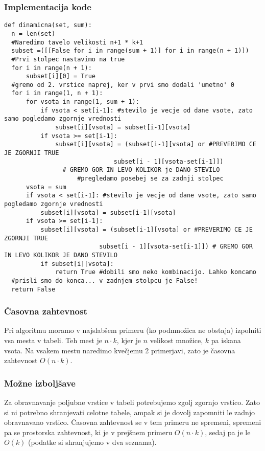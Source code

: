 \documentclass[12pt]{article}
\begin{document}
\subsubsection{Implementacija kode}
\begin{lstlisting}
def dinamicna(set, sum):
  n = len(set)
  #Naredimo tavelo velikosti n+1 * k+1
  subset =([[False for i in range(sum + 1)] for i in range(n + 1)])
  #Prvi stolpec nastavimo na true
  for i in range(n + 1):
      subset[i][0] = True
  #gremo od 2. vrstice naprej, ker v prvi smo dodali 'umetno' 0
  for i in range(1, n + 1):
      for vsota in range(1, sum + 1):
          if vsota < set[i-1]: #stevilo je vecje od dane vsote, zato samo pogledamo zgornje vrednosti 
              subset[i][vsota] = subset[i-1][vsota] 
          if vsota >= set[i-1]:
              subset[i][vsota] = (subset[i-1][vsota] or #PREVERIMO CE JE ZGORNJI TRUE
                              subset[i - 1][vsota-set[i-1]]) 
                # GREMO GOR IN LEVO KOLIKOR je DANO STEVILO
                    #pregledamo posebej se za zadnji stolpec
      vsota = sum
      if vsota < set[i-1]: #stevilo je vecje od dane vsote, zato samo pogledamo zgornje vrednosti 
          subset[i][vsota] = subset[i-1][vsota] 
      if vsota >= set[i-1]:
          subset[i][vsota] = (subset[i-1][vsota] or #PREVERIMO CE JE ZGORNJI TRUE
                          subset[i - 1][vsota-set[i-1]]) # GREMO GOR IN LEVO KOLIKOR JE DANO STEVILO
          if subset[i][vsota]:
              return True #dobili smo neko kombinacijo. Lahko koncamo
  #prisli smo do konca... v zadnjem stolpcu je False!
  return False
\end{lstlisting}

\subsubsection{Časovna zahtevnost}
Pri algoritmu moramo v najslabšem primeru (ko podmnožica ne obstaja) izpolniti vsa mesta
v tabeli. Teh mest je $n \cdot k$, kjer je $n$ velikost množice, $k$ pa iskana vsota. Na vsakem mestu naredimo 
kvečjemu 2 primerjavi, zato je časovna zahtevnost $O(n \cdot k)$. 

\subsubsection{Možne izboljšave}
Za obravnavanje poljubne vrstice v tabeli potrebujemo zgolj zgornjo vrstico. 
Zato si ni potrebno shranjevati celotne tabele, ampak si je dovolj zapomniti le zadnjo obravnavano
vrstico. \newline
Časovna zahtevnost se v tem primeru ne spremeni, spremeni pa se prostorska zahtevnost, ki
je v prejšnem primeru $O(n\cdot k)$, sedaj pa je le $O(k)$ (podatke si shranjujemo v dva seznama).
\end{document}
